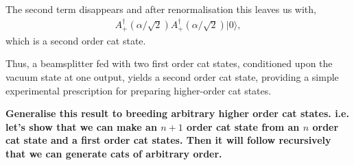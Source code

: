 \documentclass[aps,prl,twocolumn,amsmath,amssymb,nofootinbib,superscriptaddress]{revtex4}
\newcommand{\ket}[1]{|#1\rangle}
\begin{document}
The second term disappears and after renormalisation this leaves us with,
\begin{eqnarray}
A_+^\dag(\alpha/\sqrt{2}) A_+^\dag(\alpha/\sqrt{2})\ket{0},
\end{eqnarray}
which is a second order cat state.

Thus, a beamsplitter fed with two first order cat states, conditioned upon the vacuum state at one output, yields a second order cat state, providing a simple experimental prescription for preparing higher-order cat states.

\textbf{Generalise this result to breeding arbitrary higher order cat states. i.e. let's show that we can make an $n+1$ order cat state from an $n$ order cat state and a first order cat states. Then it will follow recursively that we can generate cats of arbitrary order.}



\end{document}
